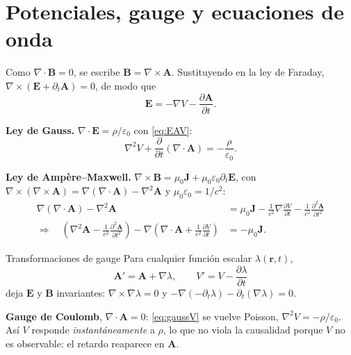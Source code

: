\documentclass[11pt,a4paper]{article}
\newcommand{\rr}{\mathbf r}
\theoremstyle{remark}
\begin{document}
\section{Potenciales, gauge y ecuaciones de onda}

Como $\nabla\cdot\mathbf B=0$, se escribe $\mathbf B=\nabla\times\mathbf A$. Sustituyendo en la ley
de Faraday, $\nabla\times(\mathbf E+\partial_t\mathbf A)=0$, de modo que
\begin{equation}
\mathbf E=-\nabla V-\frac{\partial\mathbf A}{\partial t}.
\label{eq:EAV}
\end{equation}

\textbf{Ley de Gauss.} $\nabla\cdot\mathbf E=\rho/\varepsilon_0$ con \eqref{eq:EAV}:
\begin{equation}
\nabla^2V+\frac{\partial}{\partial t}(\nabla\cdot\mathbf A)=-\frac{\rho}{\varepsilon_0}.
\label{eq:gaussV}
\end{equation}

\textbf{Ley de Ampère--Maxwell.} $\nabla\times\mathbf B=\mu_0\mathbf J+\mu_0\varepsilon_0\partial_t\mathbf E$,
con $\nabla\times(\nabla\times\mathbf A)=\nabla(\nabla\cdot\mathbf A)-\nabla^2\mathbf A$ y
$\mu_0\varepsilon_0=1/c^2$:
\begin{align}
\nabla(\nabla\cdot\mathbf A)-\nabla^2\mathbf A
&=\mu_0\mathbf J-\frac1{c^2}\nabla\frac{\partial V}{\partial t}-\frac1{c^2}\frac{\partial^2\mathbf A}{\partial t^2}\nonumber\\
\Rightarrow\quad
\left(\nabla^2\mathbf A-\frac1{c^2}\frac{\partial^2\mathbf A}{\partial t^2}\right)
-\nabla\!\left(\nabla\cdot\mathbf A+\frac1{c^2}\frac{\partial V}{\partial t}\right)&=-\mu_0\mathbf J.
\label{eq:ampA}
\end{align}

\begin{resbox}{Transformaciones de gauge}
Para cualquier función escalar $\lambda(\rr,t)$,
\[
\mathbf A'=\mathbf A+\nabla\lambda,\qquad V'=V-\frac{\partial\lambda}{\partial t}
\]
deja $\mathbf E$ y $\mathbf B$ invariantes: $\nabla\times\nabla\lambda=0$ y
$-\nabla(-\partial_t\lambda)-\partial_t(\nabla\lambda)=0$.
\end{resbox}

\textbf{Gauge de Coulomb}, $\nabla\cdot\mathbf A=0$: \eqref{eq:gaussV} se vuelve Poisson,
$\nabla^2V=-\rho/\varepsilon_0$. Así $V$ responde \emph{instantáneamente} a $\rho$, lo que no viola la
causalidad porque $V$ no es observable: el retardo reaparece en $\mathbf A$.
\end{document}
